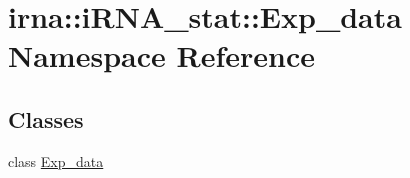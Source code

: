 \hypertarget{namespaceirna_1_1iRNA__stat_1_1Exp__data}{
\section{irna\-:\-:i\-R\-N\-A\-\_\-stat\-:\-:\-Exp\-\_\-data \-Namespace \-Reference}
\label{namespaceirna_1_1iRNA__stat_1_1Exp__data}
}
\subsection*{\-Classes}
\begin{DoxyCompactItemize}
\item 
class \hyperlink{classirna_1_1iRNA__stat_1_1Exp__data_1_1Exp__data}{\-Exp\-\_\-data}
\end{DoxyCompactItemize}
